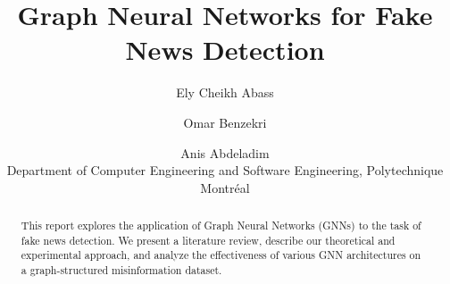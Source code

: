 \documentclass{article}
\title{Graph Neural Networks for Fake News Detection}
\author{
Ely Cheikh Abass\and
Omar Benzekri\and
Anis Abdeladim\\
\affiliations
Department of Computer Engineering and Software Engineering, Polytechnique Montréal\\
}
\begin{document}
\maketitle


\begin{abstract}
This report explores the application of Graph Neural Networks (GNNs) to the task of fake news detection. We present a literature review, describe our theoretical and experimental approach, and analyze the effectiveness of various GNN architectures on a graph-structured misinformation dataset.
\end{abstract}










\end{document}
